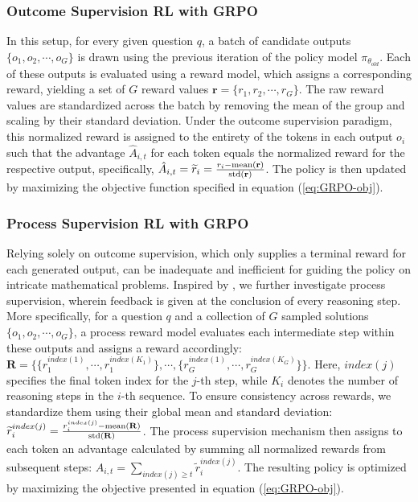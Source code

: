 \subsubsection{Outcome Supervision RL with GRPO} In this setup, for every given question $q$, a batch of candidate outputs $\{o_1, o_2, \cdots, o_G\}$ is drawn using the previous iteration of the policy model $\pi_{\theta_{old}}$. Each of these outputs is evaluated using a reward model, which assigns a corresponding reward, yielding a set of $G$ reward values $\mathbf{r}=\{r_1, r_2, \cdots, r_G\}$. The raw reward values are standardized across the batch by removing the mean of the group and scaling by their standard deviation. Under the outcome supervision paradigm, this normalized reward is assigned to the entirety of the tokens in each output $o_i$ such that the advantage $\hat{A}_{i, t}$ for each token equals the normalized reward for the respective output, specifically, $\hat{A}_{i, t} = \widetilde{r}_i = \frac{r_i- {\rm mean}(\mathbf{r})}{{\rm std}(\mathbf{r})}$. The policy is then updated by maximizing the objective function specified in equation (\ref{eq:GRPO-obj}).

\subsubsection{Process Supervision RL with GRPO} Relying solely on outcome supervision, which only supplies a terminal reward for each generated output, can be inadequate and inefficient for guiding the policy on intricate mathematical problems. Inspired by \cite{wang2023math}, we further investigate process supervision, wherein feedback is given at the conclusion of every reasoning step. More specifically, for a question $q$ and a collection of $G$ sampled solutions $\{o_1, o_2, \cdots, o_G\}$, a process reward model evaluates each intermediate step within these outputs and assigns a reward accordingly: $\mathbf{R} = \{ \{r_1^{index(1)},\cdots,r_1^{index(K_1)}\}, \cdots,  \{r_G^{index(1)},\cdots,r_G^{index(K_G)}\} \}$. Here, $index(j)$ specifies the final token index for the $j$-th step, while $K_i$ denotes the number of reasoning steps in the $i$-th sequence. To ensure consistency across rewards, we standardize them using their global mean and standard deviation: $\widetilde{r}_i^{index(j)} = \frac{r_i^{index(j)} - {\rm mean(\mathbf{R})}}{{\rm std(\mathbf{R})}}$. The process supervision mechanism then assigns to each token an advantage calculated by summing all normalized rewards from subsequent steps: $\hat{A}_{i, t} = \sum_{index(j) \ge t} \widetilde{r}_i^{index(j)}$. The resulting policy is optimized by maximizing the objective presented in equation (\ref{eq:GRPO-obj}).

